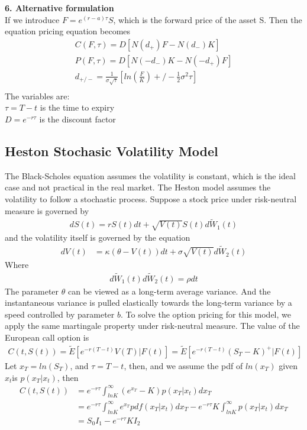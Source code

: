 \documentclass[a4paper]{article}
\begin{document}
{\bf 6. Alternative formulation}\\
If we introduce $F = e^{(r-a)\tau} S$, which is the forward price of the asset S. Then the equation pricing equation becomes
\begin{align*}
	C(F,\tau)= D[N(d_+)F - N(d_-)K] \\
	P(F,\tau)= D[N(-d_-)K - N(-d_+)F] \\
	d_{+/-} = \frac{1}{\sigma \sqrt{\tau}}[ln(\frac{F}{K})+/-\frac{1}{2}\sigma^2 \tau] \\
\end{align*}
The variables are:\\
$\tau = T - t$ is the time to expiry\\
$D = e^{-r\tau}$ is the discount factor \\
\subsection{Heston Stochasic Volatility Model}
The Black-Scholes equation assumes the volatility is constant, which is the ideal case and not practical in the real market. The Heston model\cite{heston} assumes the volatility to follow a stochastic process. Suppose a stock price under risk-neutral measure is governed by
\begin{align}
	dS(t) = rS(t)dt + \sqrt{V(t)} S(t) d \tilde W_1(t) 
\end{align}
and the volatility itself is governed by the equation
\begin{align}
	dV(t) & = \kappa (\theta -V(t))dt + \sigma \sqrt{V(t)} d \tilde W_2(t) \label{heston_volatility}
\end{align}
Where 
\begin{align*}
	d\tilde W_1(t) d\tilde W_2(t) = \rho dt
\end{align*}
The parameter $\theta$ can be viewed as a long-term average variance. And the instantaneous variance is pulled elastically towards the long-term variance by a speed controlled by parameter $b$. To solve the option pricing for this model, we apply the same martingale property under risk-neutral measure. The value of the European call option is
\begin{align*}
	C(t, S(t)) = \tilde E[e^{-r(T-t)}V(T)| F(t)] = \tilde E[e^{-r(T-t)}(S_T - K)^{+}| F(t)]
\end{align*}
Let $x_T = ln(S_T)$, and $\tau = T - t$, then, and we assume the pdf of $ln(x_T)$ given $x_t$is $p(x_T | x_t)$, then
\begin{align}
	C(t, S(t)) & = e^{ -r \tau } \int_{lnK}^{\infty} (e^{x_T} - K) p(x_T| x_t) dx_T \nonumber \\ 
		   & = e^{-r \tau}\int_{lnK}^{\infty} e^{x_T} pdf(x_T| x_t) dx_T 
		   - e^{-r\tau} K \int_{lnK}^{\infty}  p(x_T | x_t) dx_T \nonumber \\
		   & = S_0 I_1 -  e^{-r \tau} K I_2 \label{heston_solution_form}
\end{align}
\end{document}
